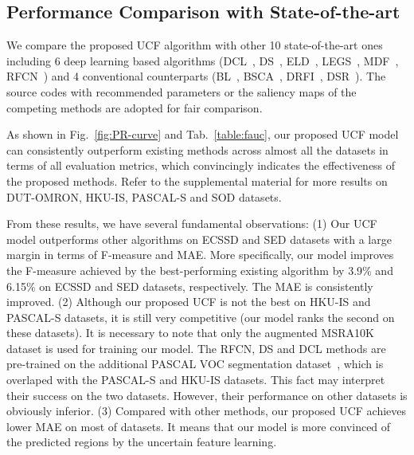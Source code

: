 \documentclass[10pt,twocolumn,letterpaper]{article}
\begin{document}
\begin{table*}
\begin{center}
\begin{tabular}{|c|c|c|c|c|c|c|c|c|c|c|c|c|c|c||c|c|c|c|c|c|c|c|c|c|c|c|c|c|c|c|c|c|c|c|c|c|c|c|c|||c|c|c|c|c|c|c|c|||}
\hline
\end{tabular}
\vspace{0.7mm}
\caption{The F-measure and MAE of different saliency detection methods on five frequently used datasets.
The best three results are shown in \textcolor[rgb]{1,0,0}{red},~\textcolor[rgb]{0,1,0}{green} and \textcolor[rgb]{0,0,1}{blue}, respectively. The proposed methods rank first and second on these datasets.}
\label{table:fauc}
\end{center}
\vspace{-10mm}
\end{table*}
\subsection{Performance Comparison with State-of-the-art}
We compare the proposed UCF algorithm with other 10 state-of-the-art ones including 6
deep learning based algorithms (DCL~\cite{Li_2016_CVPR}, DS~\cite{Li2016DeepSaliency}, ELD~\cite{Lee_2016_CVPR}, LEGS~\cite{wang2015deep}, MDF~\cite{zhao2015saliency}, RFCN~\cite{wang2016saliency})
and 4 conventional counterparts (BL~\cite{tong2015bootstrap}, BSCA~\cite{qin2015saliency}, DRFI~\cite{jiang2013salient}, DSR~\cite{li2013saliency}).
The source codes with recommended parameters or the saliency maps of the competing methods are adopted for fair comparison.

As shown in Fig.~\ref{fig:PR-curve} and Tab.~\ref{table:fauc}, our proposed UCF model can consistently outperform
existing methods across almost all the datasets in terms of all evaluation metrics, which convincingly indicates the effectiveness of the proposed methods.
Refer to the supplemental material for more results on DUT-OMRON, HKU-IS, PASCAL-S and SOD datasets.


From these results, we have several fundamental observations:
(1) Our UCF model outperforms other algorithms on ECSSD and SED datasets with a large margin in terms of F-measure and MAE.
More specifically, our model improves the F-measure achieved by the best-performing existing algorithm by 3.9\% and 6.15\% on ECSSD and SED datasets, respectively.
The MAE is consistently improved.
(2) Although our proposed UCF is not the best on HKU-IS and PASCAL-S datasets, it is still very competitive (our model ranks the second on these datasets).
It is necessary to note that only the augmented MSRA10K dataset is used for training our model.
The RFCN, DS and DCL methods are pre-trained on the additional PASCAL VOC segmentation dataset~\cite{pascal-voc-2012}, which is overlaped with the PASCAL-S and HKU-IS datasets.
This fact may interpret their success on the two datasets.
However, their performance on other datasets is obviously inferior.
(3) Compared with other methods, our proposed UCF achieves lower MAE on most of datasets.
It means that our model is more convinced of the predicted regions by the uncertain feature learning.
\end{document}
